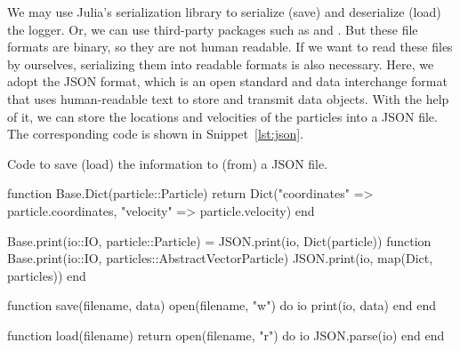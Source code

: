 We may use Julia's serialization library  to
serialize (save) and deserialize (load) the logger. Or, we can use third-party packages
such as \href{https://github.com/JuliaIO/JLD.jl}{} and
\href{https://github.com/JuliaIO/JLD2.jl}{}.
But these file formats are binary, so they are not human readable.
If we want to read these files by ourselves, serializing them into readable formats
is also necessary. Here, we adopt the JSON format, which
is an open standard and data interchange format that uses human-readable text to
store and transmit data objects. With the help of it, we can store the locations
and velocities of the particles into a JSON file. The corresponding code is shown in
Snippet~\ref{lst:json}.

\begin{algorithm}[H]
    \caption{Code to save (load) the information to (from) a JSON file.}
    \label{lst:json}
    \begin{juliacode}
        function Base.Dict(particle::Particle)
            return Dict("coordinates" => particle.coordinates, "velocity" => particle.velocity)
        end

        Base.print(io::IO, particle::Particle) = JSON.print(io, Dict(particle))
        function Base.print(io::IO, particles::AbstractVector{Particle})
            JSON.print(io, map(Dict, particles))
        end

        function save(filename, data)
            open(filename, "w") do io
                print(io, data)
            end
        end

        function load(filename)
            return open(filename, "r") do io
                JSON.parse(io)
            end
        end
    \end{juliacode}
\end{algorithm}
